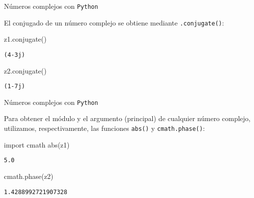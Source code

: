 \documentclass[
  ignorenonframetext,
]{beamer}
\newenvironment{Shaded}{\begin{snugshade}}{\end{snugshade}}
\newcommand{\BuiltInTok}[1]{#1}
\newcommand{\ImportTok}[1]{#1}
\newcommand{\NormalTok}[1]{#1}
\begin{document}
\begin{frame}[fragile]{Números complejos con \texttt{Python}}
\protect\hypertarget{nuxfameros-complejos-con-python-5}{}

El conjugado de un número complejo se obtiene mediante
\texttt{.conjugate()}:

\begin{Shaded}
\begin{Highlighting}[]
\NormalTok{z1.conjugate()}
\end{Highlighting}
\end{Shaded}

\begin{verbatim}
(4-3j)
\end{verbatim}

\begin{Shaded}
\begin{Highlighting}[]
\NormalTok{z2.conjugate()}
\end{Highlighting}
\end{Shaded}

\begin{verbatim}
(1-7j)
\end{verbatim}

\end{frame}

\begin{frame}[fragile]{Números complejos con \texttt{Python}}
\protect\hypertarget{nuxfameros-complejos-con-python-6}{}

Para obtener el módulo y el argumento (principal) de cualquier número
complejo, utilizamos, respectivamente, las funciones \texttt{abs()} y
\texttt{cmath.phase()}:

\begin{Shaded}
\begin{Highlighting}[]
\ImportTok{import}\NormalTok{ cmath}
\BuiltInTok{abs}\NormalTok{(z1)}
\end{Highlighting}
\end{Shaded}

\begin{verbatim}
5.0
\end{verbatim}

\begin{Shaded}
\begin{Highlighting}[]
\NormalTok{cmath.phase(z2)}
\end{Highlighting}
\end{Shaded}

\begin{verbatim}
1.4288992721907328
\end{verbatim}

\end{frame}
\end{document}

